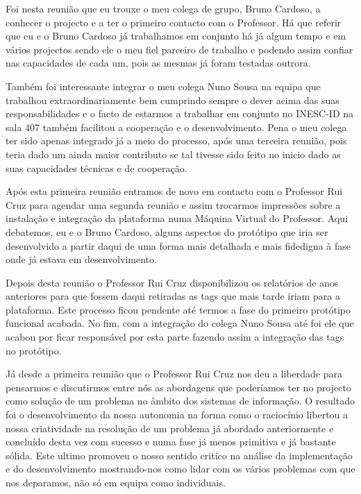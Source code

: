 \documentclass[a4paper,12pt,journal,twoside,compsoc]{PPIEEEtran}
\begin{document}
Foi nesta reunião que eu trouxe o meu colega de grupo, Bruno Cardoso, a conhecer o projecto e a ter o primeiro contacto com o Professor. Há que referir que eu e o Bruno Cardoso já trabalhamos em conjunto há já algum tempo e em vários projectos sendo ele o meu fiel parceiro de trabalho e podendo assim confiar nas capacidades de cada um, pois as mesmas já foram testadas outrora.

Também foi interessante integrar o meu colega Nuno Sousa na equipa que trabalhou extraordinariamente bem cumprindo sempre o dever acima das suas responsabilidades e o facto de estarmos a trabalhar em conjunto no INESC-ID na sala 407 também facilitou a cooperação e o desenvolvimento. Pena o meu colega ter sido apenas integrado já a meio do processo, após uma terceira reunião, pois teria dado um ainda maior contributo se tal tivesse sido feito no inicio dado as suas capacidades técnicas e de cooperação.

Após esta primeira reunião entramos de novo em contacto com o Professor Rui Cruz para agendar uma segunda reunião e assim trocarmos impressões sobre a instalação e integração da plataforma numa Máquina Virtual do Professor. Aqui debatemos, eu e o Bruno Cardoso, alguns aspectos do protótipo que iria ser desenvolvido a partir daqui de uma forma mais detalhada e mais fidedigna à fase onde já estava em desenvolvimento.

Depois desta reunião o Professor Rui Cruz disponibilizou os relatórios de anos anteriores para que fossem daqui retiradas as tags que mais tarde iriam para a plataforma. Este processo ficou pendente até termos a fase do primeiro protótipo funcional acabada. No fim, com a integração do colega Nuno Sousa até foi ele que acabou por ficar responsável por esta parte fazendo assim a integração das tags no protótipo.

Já desde a primeira reunião que o Professor Rui Cruz nos deu a liberdade para pensarmos e discutirmos entre nós as abordagens que poderíamos ter no projecto como solução de um problema no âmbito dos sistemas de informação. O resultado foi o desenvolvimento da nossa autonomia na forma como o raciocínio libertou a nossa criatividade na resolução de um problema já abordado anteriormente e concluído desta vez com sucesso e numa fase já menos primitiva e já bastante sólida. Este ultimo promoveu o nosso sentido critico na análise da implementação e do desenvolvimento mostrando-nos como lidar com os vários problemas com que nos deparamos, não só em equipa como individuais.
\end{document}
